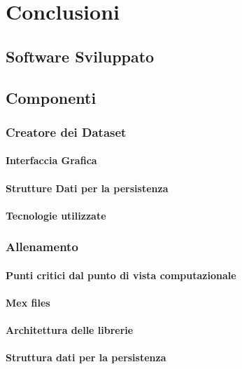 
\chapter{Conclusioni}

\begin{appendices}
    \chapter{Software Sviluppato}
    \label{chap:software}
        \section{Componenti}
            \subsection{Creatore dei Dataset}
                \subsubsection{Interfaccia Grafica}
                \subsubsection{Strutture Dati per la persistenza}
                \subsubsection{Tecnologie utilizzate}
            \subsection{Allenamento}
                \subsubsection{Punti critici dal punto di vista computazionale}
                \subsubsection{Mex files}
                \subsubsection{Architettura delle librerie}
                \subsubsection{Struttura dati per la persistenza}

\end{appendices}
